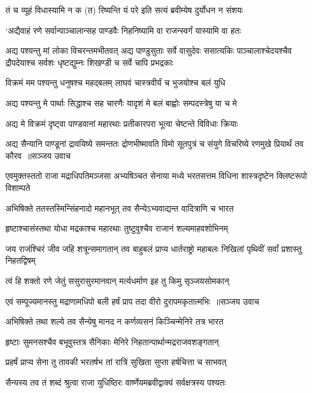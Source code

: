 \twolineshloka
{तं च व्यूहं विधास्यामि न क (त) रिष्यन्ति यं परे}
{इति सत्यं ब्रवीम्येष दुर्योधन न संशयः}


\twolineshloka
{`अद्यैवाहं रणे सर्वान्पाञ्चालान्सह पाण्डवैः}
{निहनिष्यामि वा राजन्स्वर्गं यास्यामि वा हतः}


अद्य पश्यन्तु मां लोका विचरन्तमभीतवत्
\threelineshloka
{अद्य पाण्डुसुताः सर्वे वासुदेवः ससात्यकिः}
{पाञ्चालाश्चेदयश्चैव द्रौपदेयाश्च सर्वशः}
{धृष्टद्युम्नः शिखण्डी च सर्वे चापि प्रभद्रकाः}


\twolineshloka
{विक्रमं मम पश्यन्तु धनुषश्च महद्बलम्}
{लाघवं चास्त्रवीर्यं च भुजयोश्च बलं युधि}


\twolineshloka
{अद्य पश्यन्तु मे पार्थाः सिद्धाश्च सह चारणैः}
{यादृशं मे बलं बाह्वोः सम्पदस्त्रेषु या च मे}


\twolineshloka
{अद्य मे विक्रमं दृष्ट्वा पाण्डवानां महारथाः}
{प्रतीकारपरा भूत्वा चेष्टन्ते विविधाः क्रियाः}


अद्य सैन्यानि पाण्डूनां द्रावयिष्ये समन्ततः
\threelineshloka
{द्रोणभीष्मावति विमो सूतपुत्रं च संयुगे}
{विचरिष्ये रणमुखे प्रियार्थं तव कौरव ॥सञ्जय उवाच}
{}


\threelineshloka
{एवमुक्तस्ततो राजा मद्राधिपतिमञ्जसा}
{अभ्यषिञ्चत सेनाया मध्ये भरतसत्तम}
{विधिना शास्त्रदृष्टेन क्लिष्टरूपो विशाम्पते}


\twolineshloka
{अभिषिक्ते ततस्तस्मिन्सिंहनादो महानभूत्}
{तव सैन्येऽभ्यवाद्यन्त वादित्राणि च भारत}


\twolineshloka
{हृष्टाश्चासंस्तथा योधा मद्रकाश्च महारथाः}
{तुष्टुवुश्चैव राजानं शल्यमाहवशोभिनम्}


\threelineshloka
{जय राजंश्चिरं जीव जहि शत्रून्समागतान्}
{तव बाहुबलं प्राप्य धार्तराष्ट्रो महाबलः}
{निखिलां पृथिवीं सर्वां प्रशास्तु निहतद्विषम्}


\twolineshloka
{त्वं हि शक्तो रणे जेतुं ससुरासुरमानवान्}
{मर्त्यधर्माण इह तु किमु सृञ्जयसोमकान्}


\threelineshloka
{एवं सम्पूज्यमानस्तु मद्राणामधिपो बली}
{हर्षं प्राप तदा वीरो दुरापमकृतात्मभिः ॥सञ्जय उवाच}
{}


\twolineshloka
{अभिषिक्ते तथा शल्ये तव सैन्येषु मानद}
{न कर्णव्यसनं किञ्चिन्मेनिरे तत्र भारत}


\twolineshloka
{हृष्टाः सुमनसश्चैव बभूवुस्तत्र सैनिकाः}
{मेनिरे निहतान्पार्थान्मद्रराजवशङ्गतान्}


\twolineshloka
{प्रहर्षं प्राप्य सेना तु तावकी भरतर्षभ}
{तां रात्रिं सुखिता सुप्ता हर्षचित्ता च साभवत्}


\twolineshloka
{सैन्यस्य तव तं शब्दं श्रुत्वा राजा युधिष्ठिरः}
{वार्ष्णेयमब्रवीद्वाक्यं सर्वक्षत्रस्य पश्यतः}


